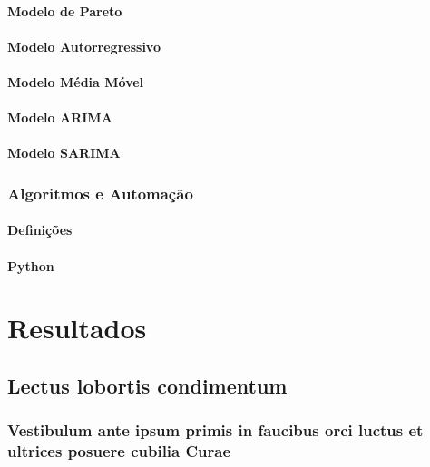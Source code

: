\documentclass[
	12pt,				%
	openright,			%
	twoside,			%
	a4paper,			%
	english,			%
	french,				%
	spanish,			%
	brazil				%
	]{abntex2}
\begin{document}
\subsection{Modelo de Pareto}
\subsection{Modelo Autorregressivo}
\subsection{Modelo Média Móvel}
\subsection{Modelo ARIMA}
\subsection{Modelo SARIMA}

\section{Algoritmos e Automação}

\subsection{Definições}
\subsection{Python}



\part{Resultados}

\chapter{Lectus lobortis condimentum}

\section{Vestibulum ante ipsum primis in faucibus orci luctus et ultrices
posuere cubilia Curae}
\end{document}
